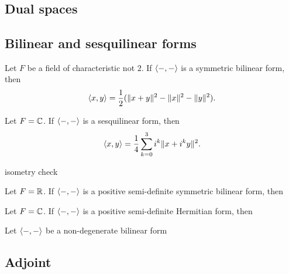 \documentclass{../note}
\begin{document}
\chapter{}
\section{Dual spaces}

\begin{prb}
\end{prb}

\section{Bilinear and sesquilinear forms}

\begin{prb}
\begin{parts}
\item Let $F$ be a field of characteristic not $2$. If $\langle-,-\rangle$ is a symmetric bilinear form, then
\[\langle x,y\rangle=\frac12(\|x+y\|^2-\|x\|^2-\|y\|^2).\]
\item Let $F=\mathbb{C}$. If $\langle-,-\rangle$ is a sesquilinear form, then
\[\langle x,y\rangle=\frac14\sum_{k=0}^3i^k\|x+i^ky\|^2.\]
\item isometry check
\end{parts}
\end{prb}

\begin{prb}
\begin{parts}
\item Let $F=\mathbb{R}$. If $\langle-,-\rangle$ is a positive semi-definite symmetric bilinear form, then
\item Let $F=\mathbb{C}$. If $\langle-,-\rangle$ is a positive semi-definite Hermitian form, then
\end{parts}
\end{prb}

\begin{prb}
Let $\langle-,-\rangle$ be a non-degenerate bilinear form
\end{prb}

\section{Adjoint}
\begin{prb}
\end{prb}
\end{document}
